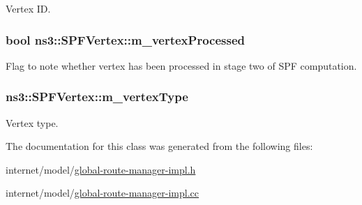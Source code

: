 Vertex ID. 

\subsubsection[{\texorpdfstring{m\+\_\+vertex\+Processed}{m_vertexProcessed}}]{\setlength{\rightskip}{0pt plus 5cm}bool ns3\+::\+S\+P\+F\+Vertex\+::m\+\_\+vertex\+Processed\hspace{0.3cm}{\ttfamily [private]}}\hypertarget{classns3_1_1SPFVertex_ac629016bfe46ad93090d6ae92782769d}{}\label{classns3_1_1SPFVertex_ac629016bfe46ad93090d6ae92782769d}


Flag to note whether vertex has been processed in stage two of S\+PF computation. 

\subsubsection[{\texorpdfstring{m\+\_\+vertex\+Type}{m_vertexType}}]{ ns3\+::\+S\+P\+F\+Vertex\+::m\+\_\+vertex\+Type\hspace{0.3cm}{\ttfamily [private]}}\hypertarget{classns3_1_1SPFVertex_af2b0b127b4e6830d836a85506943e9fb}{}\label{classns3_1_1SPFVertex_af2b0b127b4e6830d836a85506943e9fb}


Vertex type. 



The documentation for this class was generated from the following files\+:\begin{DoxyCompactItemize}
\item 
internet/model/\hyperlink{global-route-manager-impl_8h}{global-\/route-\/manager-\/impl.\+h}\item 
internet/model/\hyperlink{global-route-manager-impl_8cc}{global-\/route-\/manager-\/impl.\+cc}\end{DoxyCompactItemize}
